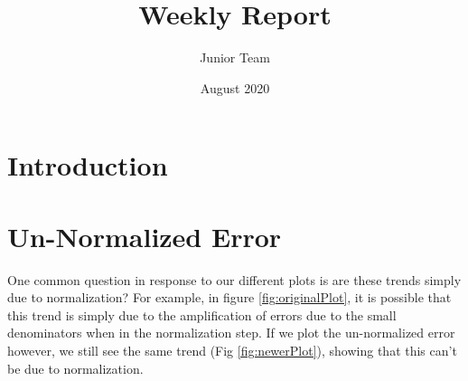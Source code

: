 \documentclass{article}
\title{Weekly Report}
\author{Junior Team }
\date{August 2020}
\begin{document}
\maketitle

\section*{Introduction}

\section{Un-Normalized Error}
One common question in response to our different plots is are these trends simply due to normalization? For example, in figure \ref{fig:originalPlot}, it is possible that this trend is simply due to the amplification of errors due to the small denominators when in the normalization step. If we plot the un-normalized error however, we still see the same trend (Fig \ref{fig:newerPlot}), showing that this can't be due to normalization. 
\end{document}
